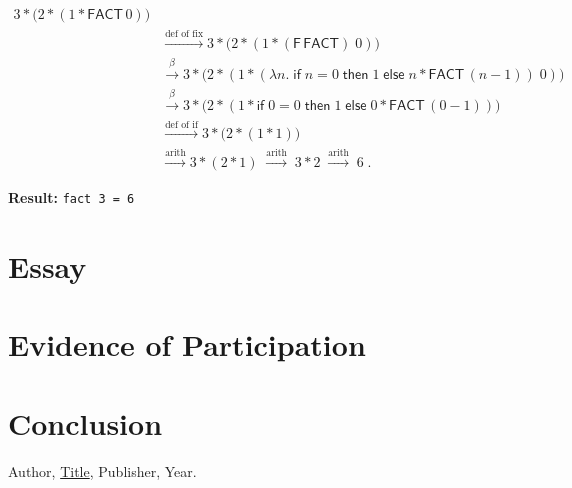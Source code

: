 \documentclass{article}
\theoremstyle{theorem}
\theoremstyle{definition}
\theoremstyle{remark}
\begin{document}
\begin{align*}
3 * \big(2 * (1 * \mathsf{FACT}\,0)\big)\\[4pt]
&\xrightarrow{\text{def of fix}}
3 * \big(2 * (1 * (\mathsf{F}\,\mathsf{FACT})\;0)\big)\\
&\xrightarrow{\beta}
3 * \big(2 * (1 * (\lambda n.\; \mathsf{if}\;n=0\;\mathsf{then}\;1\;\mathsf{else}\;n * \mathsf{FACT}\,(n-1))\;0)\big)\\
&\xrightarrow{\beta}
3 * \big(2 * (1 * \mathsf{if}\;0=0\;\mathsf{then}\;1\;\mathsf{else}\;0 * \mathsf{FACT}\,(0-1))\big)\\
&\xrightarrow{\text{def of if}}
3 * \big(2 * (1 * 1)\big)\\
&\xrightarrow{\text{arith}}
3 * (2 * 1)
\;\xrightarrow{\text{arith}}\;
3 * 2
\;\xrightarrow{\text{arith}}\;
6\;.
\end{align*}
\endgroup

\textbf{Result:} \texttt{fact 3 = 6}

\section{Essay}

\section{Evidence of Participation}

\section{Conclusion}\label{conclusion}

\begin{thebibliography}{99}
 Author, \href{https://en.wikipedia.org/wiki/LaTeX}{Title}, Publisher, Year.
\end{thebibliography}
\end{document}
